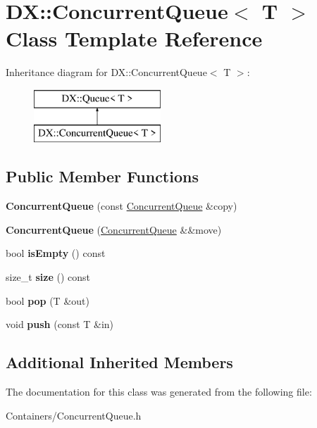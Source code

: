 \hypertarget{class_d_x_1_1_concurrent_queue}{\section{D\-X\-:\-:Concurrent\-Queue$<$ T $>$ Class Template Reference}
\label{class_d_x_1_1_concurrent_queue}
}
Inheritance diagram for D\-X\-:\-:Concurrent\-Queue$<$ T $>$\-:\begin{figure}[H]
\begin{center}
\leavevmode
\includegraphics[height=2.000000cm]{class_d_x_1_1_concurrent_queue}
\end{center}
\end{figure}
\subsection*{Public Member Functions}
\begin{DoxyCompactItemize}
\item 
\hypertarget{class_d_x_1_1_concurrent_queue_a53b572618eefcd822c5f480df1ff0a68}{{\bfseries Concurrent\-Queue} (const \hyperlink{class_d_x_1_1_concurrent_queue}{Concurrent\-Queue} \&copy)}\label{class_d_x_1_1_concurrent_queue_a53b572618eefcd822c5f480df1ff0a68}

\item 
\hypertarget{class_d_x_1_1_concurrent_queue_a97410a1d0d3a36f5ee9715ba39929f01}{{\bfseries Concurrent\-Queue} (\hyperlink{class_d_x_1_1_concurrent_queue}{Concurrent\-Queue} \&\&move)}\label{class_d_x_1_1_concurrent_queue_a97410a1d0d3a36f5ee9715ba39929f01}

\item 
\hypertarget{class_d_x_1_1_concurrent_queue_a471ad014f5c7bbcc7564792be3738e74}{bool {\bfseries is\-Empty} () const }\label{class_d_x_1_1_concurrent_queue_a471ad014f5c7bbcc7564792be3738e74}

\item 
\hypertarget{class_d_x_1_1_concurrent_queue_a8bceba6b265016871335a98ce3985cfb}{size\-\_\-t {\bfseries size} () const }\label{class_d_x_1_1_concurrent_queue_a8bceba6b265016871335a98ce3985cfb}

\item 
\hypertarget{class_d_x_1_1_concurrent_queue_a01f9f4809b11c748374b9d89927e340c}{bool {\bfseries pop} (T \&out)}\label{class_d_x_1_1_concurrent_queue_a01f9f4809b11c748374b9d89927e340c}

\item 
\hypertarget{class_d_x_1_1_concurrent_queue_a279ceb7a5c093bb0bbd26e2114dd8f31}{void {\bfseries push} (const T \&in)}\label{class_d_x_1_1_concurrent_queue_a279ceb7a5c093bb0bbd26e2114dd8f31}

\end{DoxyCompactItemize}
\subsection*{Additional Inherited Members}


The documentation for this class was generated from the following file\-:\begin{DoxyCompactItemize}
\item 
Containers/Concurrent\-Queue.\-h\end{DoxyCompactItemize}
